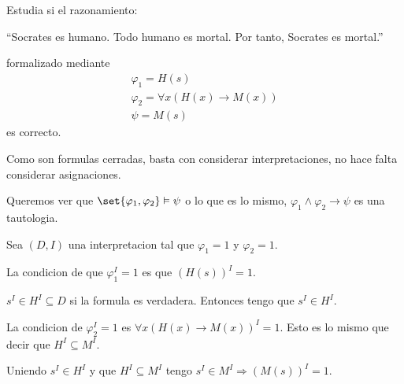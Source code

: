 \begin{example}
	Estudia si el razonamiento:

	``Socrates es humano. Todo humano es mortal. Por tanto, Socrates es mortal.''

	formalizado mediante
	\[
		\begin{array}{l}
			\varphi_1 =H(s)                              \\
			\varphi_2 = \forall x(H(x) \rightarrow M(x)) \\ \hline
			\psi = M(s)
		\end{array}
	\]
	es correcto.

	Como son formulas cerradas, basta con considerar interpretaciones, no hace falta considerar asignaciones.

	Queremos ver que \(\set{\varphi_1,\varphi_2} \vDash \psi \) o lo que es lo mismo, \(\varphi_1 \wedge  \varphi_2 \rightarrow \psi \) es una tautologia.

	Sea \((D,I )\) una interpretacion tal que \(\varphi_1 = 1 \) y \(\varphi_2 = 1 \).

	La condicion de que \(\varphi^{I}_1 = 1 \) es que \((H(s))^{I} = 1 \).

	\(s^{I} \in H^{I} \subseteq D  \) si la formula es verdadera. Entonces tengo que \(s^{I} \in H^{I } \).

	La condicion de \(\varphi^{I}_2 = 1 \) es \(\forall x (H(x) \rightarrow M(x))^{I} = 1 \). Esto es lo mismo que decir que \(H^{I} \subseteq M^{I}  \).

	Uniendo \(s^{I} \in H^{I }  \) y que \(H^{I} \subseteq M^{I } 	 \) tengo \(s^{I } \in M^{I } \Rightarrow (M(s))^{I} = 1 \).
\end{example}

